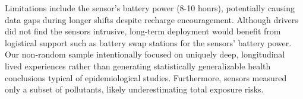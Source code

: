 

Limitations include the sensor's battery power (8-10 hours), potentially causing data gaps during longer shifts despite recharge encouragement.
Although drivers did not find the sensors intrusive, long-term deployment would benefit from logistical support such as battery swap stations for the sensors' battery power.
Our non-random sample intentionally focused on uniquely deep, longitudinal lived experiences rather than generating statistically generalizable health conclusions typical of epidemiological studies.
Furthermore, sensors measured only a subset of pollutants, likely underestimating total exposure risks.

